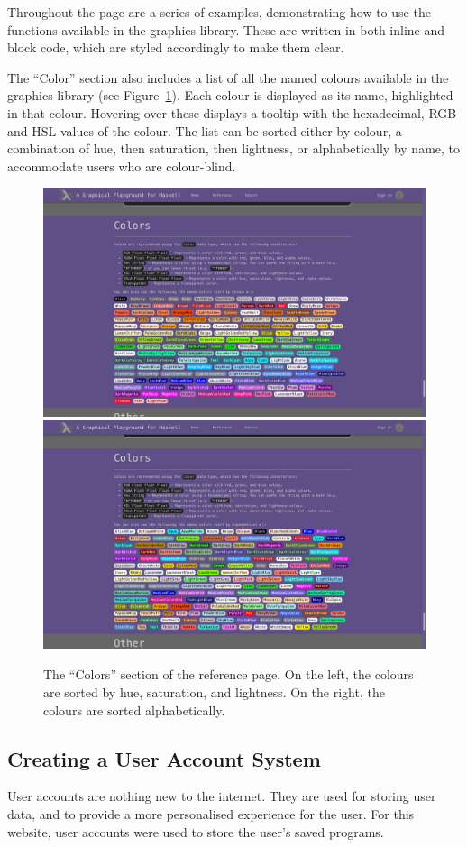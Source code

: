 \documentclass[../main.tex]{subfiles}
\begin{document}
            Throughout the page are a series of examples, demonstrating how to use the
                functions available in the graphics library.
            These are written in both inline and block code, which are styled accordingly
                to make them clear.

            The ``Color'' section also includes a list of all the named colours available
                in the graphics library (see Figure~\ref{fig:colours}).
            Each colour is displayed as its name, highlighted in that colour.
            Hovering over these displays a tooltip with the hexadecimal, RGB and HSL values
                of the colour.
            The list can be sorted either by colour, a combination of hue, then saturation,
                then lightness, or alphabetically by name, to accommodate users who are
                colour-blind.

            \begin{figure}[H]
                \centering
                \includegraphics[width=0.45\linewidth]{images/colours.png}
                \includegraphics[width=0.45\linewidth]{images/coloursAlphabetical.png}
                    \caption{The ``Colors'' section of the reference page.
                        On the left, the colours are sorted by hue, saturation, and lightness.
                        On the right, the colours are sorted alphabetically.
                    }
                    \label{fig:colours}
            \end{figure}

        \subsection{Creating a User Account System}
            User accounts are nothing new to the internet.
            They are used for storing user data, and to provide a more personalised
                experience for the user.
            For this website, user accounts were used to store the user's saved programs.
\end{document}

